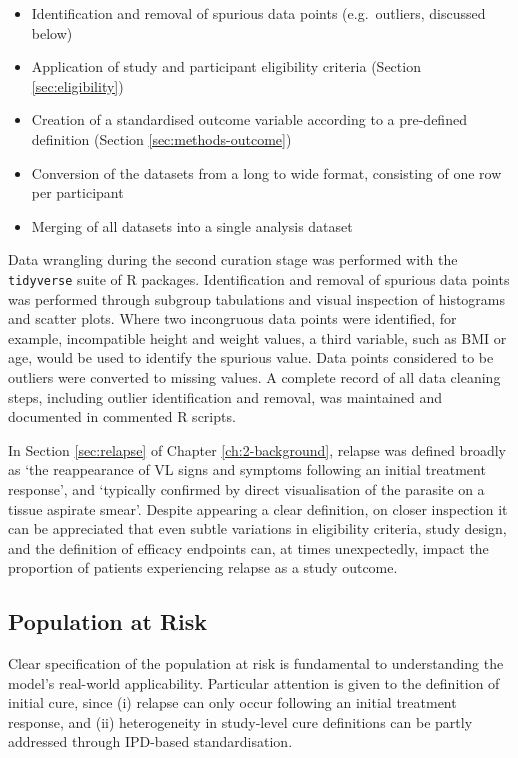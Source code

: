 \begin{itemize}[noitemsep]
  \item Identification and removal of spurious data points (e.g.\ outliers, discussed below)
  \item Application of study and participant eligibility criteria (Section \ref{sec:eligibility})
  \item Creation of a standardised outcome variable according to a pre-defined definition (Section \ref{sec:methods-outcome})
  \item Conversion of the datasets from a long to wide format, consisting of one row per participant
  \item Merging of all datasets into a single analysis dataset
\end{itemize}

Data wrangling during the second curation stage was performed with the \texttt{tidyverse} suite of R packages\cite{wickham2019}. Identification and removal of spurious data points was performed through subgroup tabulations and visual inspection of histograms and scatter plots. Where two incongruous data points were identified, for example, incompatible height and weight values, a third variable, such as BMI or age, would be used to identify the spurious value. Data points considered to be outliers were converted to missing values. A complete record of all data cleaning steps, including outlier identification and removal, was maintained and documented in commented R scripts.

In Section \ref{sec:relapse} of Chapter \ref{ch:2-background}, relapse was defined broadly as `the reappearance of VL signs and symptoms following an initial treatment response', and `typically confirmed by direct visualisation of the parasite on a tissue aspirate smear'. Despite appearing a clear definition, on closer inspection it can be appreciated that even subtle variations in eligibility criteria, study design, and the definition of efficacy endpoints can, at times unexpectedly, impact the proportion of patients experiencing relapse as a study outcome.

\subsection{\label{sec:eligibility}Population at Risk}

Clear specification of the population at risk is fundamental to understanding the model's real-world applicability\cite{riley2021_book_ch17, collins2024A}. Particular attention is given to the definition of initial cure, since (i) relapse can only occur following an initial treatment response, and (ii) heterogeneity in study-level cure definitions can be partly addressed through IPD-based standardisation.


